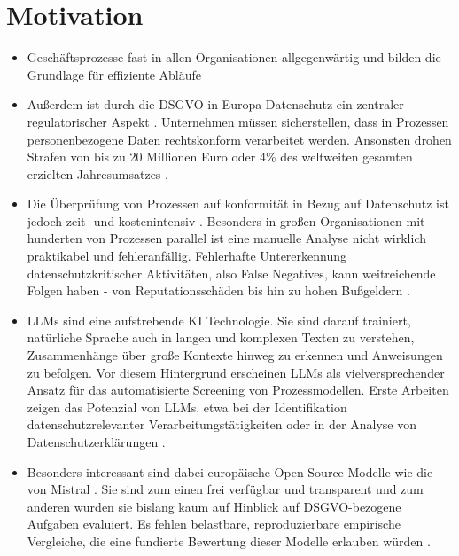 \section{Motivation}\label{sec:motivation}

\begin{itemize}
    \item Geschäftsprozesse fast in allen Organisationen allgegenwärtig und bilden die Grundlage für effiziente Abläufe
    \item Außerdem ist durch die \ac{DSGVO} in Europa Datenschutz ein zentraler regulatorischer Aspekt \cite{Capodieci2023BPMNEnabledDP, GDPR2016}. Unternehmen müssen sicherstellen, dass in Prozessen personenbezogene Daten rechtskonform verarbeitet werden. Ansonsten drohen Strafen von bis zu 20 Millionen Euro oder 4\% des weltweiten gesamten erzielten Jahresumsatzes \cite{GDPR2016}.
    \item Die Überprüfung von Prozessen auf konformität in Bezug auf Datenschutz ist jedoch zeit- und kostenintensiv \cite{nake2023towards, varela2025business}. Besonders in großen Organisationen mit hunderten von Prozessen parallel ist eine manuelle Analyse nicht wirklich praktikabel und fehleranfällig. Fehlerhafte Untererkennung datenschutzkritischer Aktivitäten, also False Negatives, kann weitreichende Folgen haben - von Reputationsschäden bis hin zu hohen Bußgeldern \cite{nake2023towards}.
    \item \acp{LLM} sind eine aufstrebende \ac{KI} Technologie. Sie sind darauf trainiert, natürliche Sprache auch in langen und komplexen Texten zu verstehen, Zusammenhänge über große Kontexte hinweg zu erkennen und Anweisungen zu befolgen. Vor diesem Hintergrund erscheinen \acp{LLM} als vielversprechender Ansatz für das automatisierte Screening von Prozessmodellen. Erste Arbeiten zeigen das Potenzial von \acp{LLM}, etwa bei der Identifikation datenschutzrelevanter Verarbeitungstätigkeiten oder in der Analyse von Datenschutzerklärungen \cite{ciaramella2022leveraging, pragyan2024toward}.
    \item Besonders interessant sind dabei europäische Open-Source-Modelle wie die von Mistral \cite{mistralai}. Sie sind zum einen frei verfügbar und transparent und zum anderen wurden sie bislang kaum auf Hinblick auf \ac{DSGVO}-bezogene Aufgaben evaluiert. Es fehlen belastbare, reproduzierbare empirische Vergleiche, die eine fundierte Bewertung dieser Modelle erlauben würden \cite{schwerin2024systematic}.
\end{itemize}